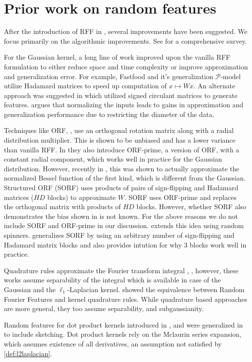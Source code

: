 \section{Prior work on random features}
After the introduction of RFF in \cite{rahimi2007random}, several improvements have been suggested. We focus primarily on the algorithmic improvements. See \cite{liu2021random} for a comprehensive survey. 

For the Gaussian kernel, a long line of work improved upon the vanilla RFF formulation to either reduce space and time complexity or improve approximation and generalization error. For example, Fastfood \cite{Fastfood} and it's generalization $\mathcal{P}$-model \cite{P_model} utilize Hadamard matrices to speed up computation of $x\mapsto Wx$. An alternate approach was suggested in \cite{scrf} which utilized signed circulant matrices to generate features. \cite{NRFF} argues that  normalizing the inputs leads to gains in approximation and generalization performance due to restricting the diameter of the data.

\begin{remark}
    Techniques like ORF, \cite{yu2016orthogonal}, use an orthogonal rotation matrix along with a radial distribution multiplier. This is shown to be unbiased and has a lower variance than vanilla RFF. In \cite{yu2016orthogonal} they also introduce ORF-prime, a version of ORF, with a constant radial component, which works well in practice for the Gaussian distribution. However, recently in \cite[Thm. 2]{demni2024orthogonal}, this was shown to actually approximate the normalized Bessel function of the first kind, which is different from the Gaussian. Structured ORF (SORF) \cite{yu2016orthogonal} uses products of pairs of sign-flipping and Hadamard matrices ($HD$ blocks) to approximate $W$. SORF uses ORF-prime and replaces the orthogonal matrix with products of $HD$ blocks. However, whether SORF also demonstrates the  bias shown in \cite{demni2024orthogonal} is not known. For the above reasons we do not include SORF and ORF-prime in our discussion. \cite{Bojarski2016StructuredAA} extends this idea using random spinners. \cite{ROM_} generalizes SORF by using an arbitrary number of sign-flipping and Hadamard matrix blocks and also provides intution for why 3 blocks work well in practice. 
\end{remark}

Quadrature rules approximate the Fourier transform integral \cite{Gauss_quad}, \cite{Quad_based_feats}, however, these works assume separability of the integral which is available in case of the Gaussian and the $\ell_1$-Laplacian kernel. \cite{Bach_equivalence} showed the equivalence between Random Fourier Features and kernel quadrature rules. While quadrature based approaches are more general, they too assume separability, and subgaussianity. 

Random features for dot product kernels introduced 
in \cite{pmlr-v22-kar12}, and were generalized in \cite{wacker2024improved} to include sketching. Dot product kernels rely on the Mclaurin series expansion, which assumes existence of all derivatives, an assumption not satisfied by \eqref{def:l2laplacian}.